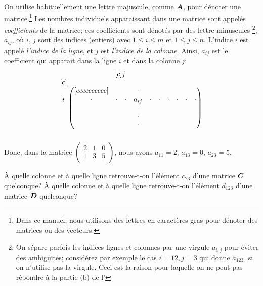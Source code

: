 On utilise habituellement une lettre majuscule, comme $\boldsymbol{A}$, pour dénoter
une matrice.\footnote{Dans ce manuel, nous utilisons des lettres en caractères gras
pour dénoter des matrices ou des vecteurs.}
Les nombres individuels apparaissant dans une matrice sont appelés
{\em coefficients} de la matrice;
ces coefficients sont dénotés par des lettre minuscules%
\footnote{On sépare parfois
les indices lignes et colonnes par une virgule $a_{i,j}$ pour éviter des ambiguïtés; considérez
par exemple le cas $i=12, j=3$ qui donne $a_{123}$, si on n'utilise pas la virgule. 
Ceci est la raison pour laquelle on ne peut pas répondre à la partie (b) de l'}, $a_{ij}$, où $i$, $j$ sont des indices (entiers)
avec $1\le i \le m$ et $1 \le j\le n$.
L'indice $i$ est appelé {\em l'indice de la ligne}, et $j$ est {\em l'indice de la colonne}.
Ainsi, $a_{ij}$ est le coefficient qui apparait dans la ligne $i$ et dans la colonne $j$:
\[
\begin{matrix}[c]
	j\hspace*{1.1cm} \\
	\begin{matrix}[c]\\ \\ i \\ \\ \\ \\ \\ \end{matrix}
	\begin{pmatrix}[cccccccccc]
	&&&\cdot&&&&&& \\
	\cdot&\cdot&\cdot&a_{ij}&\cdot&\cdot&\cdot&\cdot&\cdot&\cdot\\
	&&&\cdot&&&&&&\\
	&&&\cdot&&&&&&\\
	 &&&\cdot&&&&&&
	 \end{pmatrix}
\end{matrix}
\]
Donc, dans la matrice $\begin{pmatrix} 2 & 1 & 0 \\ 1 & 3 & 5 \\ \end{pmatrix}$, nous avons $a_{11}=2$, $a_{13}=0$,  $a_{23}=5$, \etc


\begin{exerciceB}\label{ex:ambigu}
À quelle colonne et à quelle ligne retrouve-t-on l'élément $c_{23}$ d'une matrice $\boldsymbol{C}$ quelconque?
À quelle colonne et à quelle ligne retrouve-t-on l'élément $d_{123}$ d'une matrice $\boldsymbol{D}$ quelconque?
\end{exerciceB}

